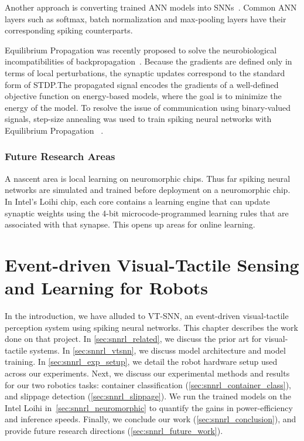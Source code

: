 \documentclass[fyp]{socreport}
\begin{document}
Another approach is converting trained ANN models into
SNNs~\cite{rueckauer16_theor_tools_conver_analog_to}. Common ANN layers such as
softmax, batch normalization and max-pooling layers have their corresponding
spiking counterparts.

Equilibrium Propagation was recently proposed to solve the neurobiological
incompatibilities of backpropagation~\cite{10.3389/fncom.2017.00024}. Because
the gradients are defined only in terms of local perturbations, the synaptic
updates correspond to the standard form of STDP.\@ The propagated signal encodes
the gradients of a well-defined objective function on energy-based models, where
the goal is to minimize the energy of the model. To resolve the issue of
communication using binary-valued signals, step-size annealing was used to train
spiking neural networks with Equilibrium Propagation
~\cite{pmlr-v89-o-connor19a}.

\subsection{Future Research Areas\label{sec:future-rese-areas}}

A nascent area is local learning on neuromorphic chips. Thus far spiking neural
networks are simulated and trained before deployment on a neuromorphic chip. In
Intel's Loihi chip, each core contains a learning engine that can update
synaptic weights using the 4-bit microcode-programmed learning rules that are
associated with that synapse. This opens up areas for online learning.

\chapter{Event-driven Visual-Tactile Sensing and Learning for Robots\label{cha:vtsnn}}

In the introduction, we have alluded to VT-SNN, an event-driven
visual-tactile perception system using spiking neural networks. This chapter
describes the work done on that project. In \autoref{sec:snnrl_related}, we
discuss the prior art for visual-tactile systems. In \autoref{sec:snnrl_vtsnn},
we discuss model architecture and model training. In
\autoref{sec:snnrl_exp_setup}, we detail the robot hardware setup used across
our experiments. Next, we discuss our experimental methods and results for our
two robotics tasks: container classification
(\autoref{sec:snnrl_container_class}), and slippage detection
(\autoref{sec:snnrl_slippage}). We run the trained models on the Intel Loihi
in~\autoref{sec:snnrl_neuromorphic} to quantify the gains in power-efficiency
and inference speeds. Finally, we conclude our work
(\autoref{sec:snnrl_conclusion}), and provide future research directions
(\autoref{sec:snnrl_future_work}).
\end{document}
